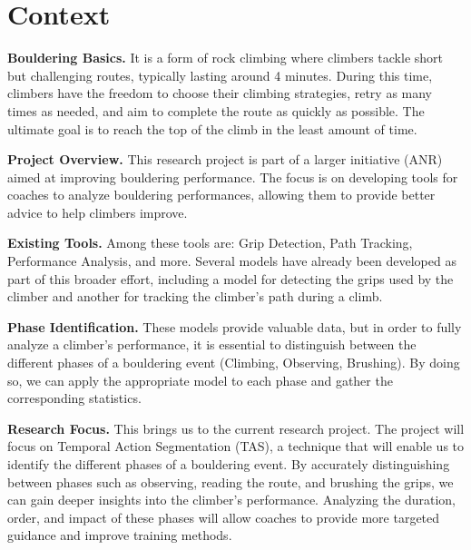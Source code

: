 \newpage
\section{Context}
\label{section:context}

\noindent\textbf{Bouldering Basics.} 
It is a form of rock climbing where climbers tackle short but challenging routes, typically lasting around 4 minutes. During this time, climbers have the freedom to choose their climbing strategies, retry as many times as needed, and aim to complete the route as quickly as possible. The ultimate goal is to reach the top of the climb in the least amount of time.

\noindent\textbf{Project Overview.} 
This research project is part of a larger initiative (ANR) aimed at improving bouldering performance. The focus is on developing tools for coaches to analyze bouldering performances, allowing them to provide better advice to help climbers improve.

\noindent\textbf{Existing Tools.} 
Among these tools are: Grip Detection, Path Tracking, Performance Analysis, and more. Several models have already been developed as part of this broader effort, including a model for detecting the grips used by the climber and another for tracking the climber's path during a climb.

\noindent\textbf{Phase Identification.} 
These models provide valuable data, but in order to fully analyze a climber's performance, it is essential to distinguish between the different phases of a bouldering event (Climbing, Observing, Brushing). By doing so, we can apply the appropriate model to each phase and gather the corresponding statistics.

\noindent\textbf{Research Focus.} 
This brings us to the current research project. The project will focus on Temporal Action Segmentation (TAS), a technique that will enable us to identify the different phases of a bouldering event. By accurately distinguishing between phases such as observing, reading the route, and brushing the grips, we can gain deeper insights into the climber's performance. Analyzing the duration, order, and impact of these phases will allow coaches to provide more targeted guidance and improve training methods.

